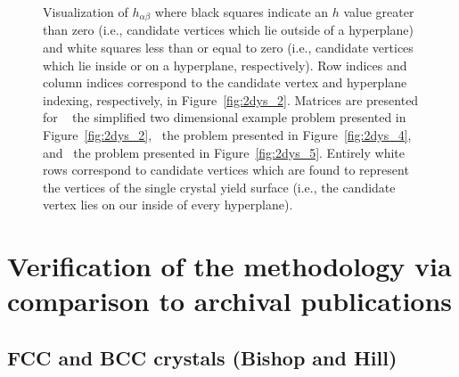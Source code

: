 \documentclass[preprint,3p,times,sort&compress,letterpaper,12pt]{elsarticle} %
\begin{document}
\begin{figure}[H]
{    }
    \caption{Visualization of $h_{\alpha\beta}$ where black squares indicate an $h$ value greater than zero (i.e., candidate vertices which lie outside of a hyperplane) and white squares less than or equal to zero (i.e., candidate vertices which lie inside or on a hyperplane, respectively). Row indices and column indices correspond to the candidate vertex and hyperplane indexing, respectively, in Figure~\ref{fig:2dys_2}. Matrices are presented for ~ the simplified two dimensional example problem presented in Figure~\ref{fig:2dys_2},~ the problem presented in Figure~\ref{fig:2dys_4}, and~ the problem presented in Figure~\ref{fig:2dys_5}. Entirely white rows correspond to candidate vertices which are found to represent the vertices of the single crystal yield surface (i.e., the candidate vertex lies on our inside of every hyperplane).}
    \label{fig:2d_h_matrix}
\end{figure}

\section{Verification of the methodology via comparison to archival publications}

\subsection{FCC and BCC crystals (Bishop and Hill)}
\label{subsec:fcc_demonstration}
\end{document}
